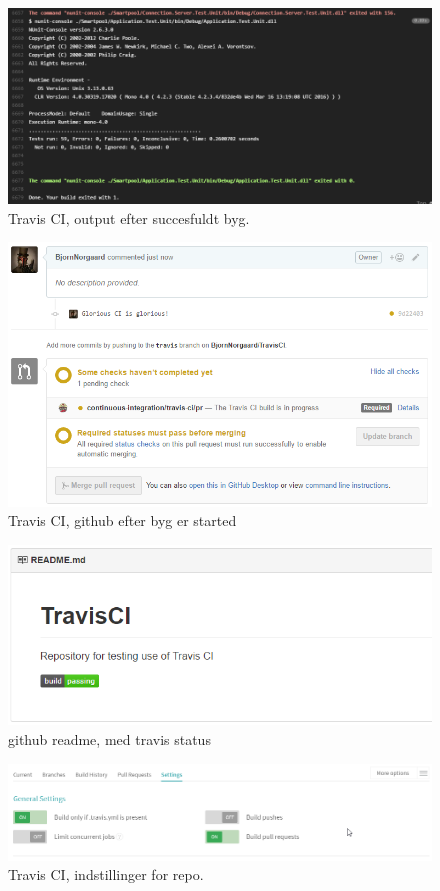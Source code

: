 \begin{figure}
\centering
\includegraphics[width=\linewidth]{figs/travis/travisoutput}
\caption{Travis CI, output efter succesfuldt byg.}
\label{fig:travisoutput}
\end{figure}

\begin{figure}
\centering
\includegraphics[width=\linewidth]{figs/travis/travispullrequest}
\caption{Travis CI, github efter byg er started}
\label{fig:travispullrequest}
\end{figure}

\begin{figure}
\centering
\includegraphics[width=\linewidth]{figs/travis/travisreadme}
\caption{github readme, med travis status}
\label{fig:travisreadme}
\end{figure}

\begin{figure}
\centering
\includegraphics[width=\linewidth]{figs/travis/travissettings}
\caption{Travis CI, indstillinger for repo.}
\label{fig:travissettings}
\end{figure}
